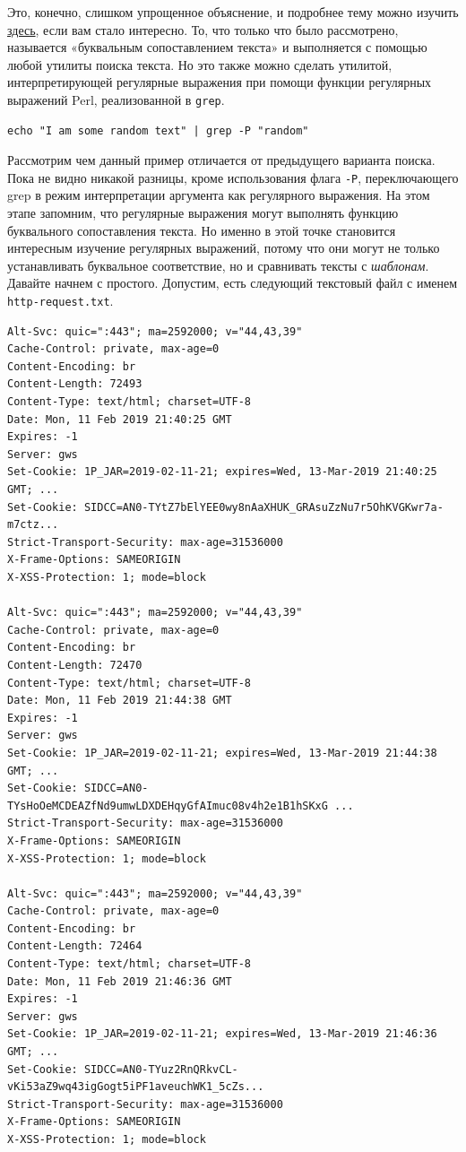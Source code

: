 \documentclass[a4paper,12pt,final,openany]{extbook}
\begin{document}
Это, конечно, слишком упрощенное объяснение, и подробнее тему можно
изучить \href{https://stackoverflow.com/a/1627904/7437737}{здесь}, если
вам стало интересно. То, что только что было рассмотрено, называется
«буквальным сопоставлением текста» и выполняется с помощью
любой утилиты поиска текста. Но это также можно сделать
утилитой, интерпретирующей регулярные выражения при помощи функции
регулярных выражений Perl, реализованной в \texttt{grep}.
\begin{verbatim}
echo "I am some random text" | grep -P "random"
\end{verbatim}

Рассмотрим чем данный пример отличается от предыдущего варианта поиска.
Пока не видно никакой разницы, кроме использования флага \texttt{-P},
переключающего grep в режим интерпретации аргумента как регулярного
выражения. На этом этапе запомним, что регулярные выражения могут
выполнять функцию буквального сопоставления текста. Но именно в этой
точке становится интересным изучение регулярных выражений, потому что
они могут не только устанавливать буквальное соответствие, но и
сравнивать тексты с \emph{шаблонам}. Давайте начнем с простого.
Допустим, есть следующий текстовый файл с именем
\texttt{http-request.txt}.
\begin{verbatim}
Alt-Svc: quic=":443"; ma=2592000; v="44,43,39"
Cache-Control: private, max-age=0
Content-Encoding: br
Content-Length: 72493
Content-Type: text/html; charset=UTF-8
Date: Mon, 11 Feb 2019 21:40:25 GMT
Expires: -1
Server: gws
Set-Cookie: 1P_JAR=2019-02-11-21; expires=Wed, 13-Mar-2019 21:40:25 GMT; ...
Set-Cookie: SIDCC=AN0-TYtZ7bElYEE0wy8nAaXHUK_GRAsuZzNu7r5OhKVGKwr7a-m7ctz...
Strict-Transport-Security: max-age=31536000
X-Frame-Options: SAMEORIGIN
X-XSS-Protection: 1; mode=block

Alt-Svc: quic=":443"; ma=2592000; v="44,43,39"
Cache-Control: private, max-age=0
Content-Encoding: br
Content-Length: 72470
Content-Type: text/html; charset=UTF-8
Date: Mon, 11 Feb 2019 21:44:38 GMT
Expires: -1
Server: gws
Set-Cookie: 1P_JAR=2019-02-11-21; expires=Wed, 13-Mar-2019 21:44:38 GMT; ...
Set-Cookie: SIDCC=AN0-TYsHoOeMCDEAZfNd9umwLDXDEHqyGfAImuc08v4h2e1B1hSKxG ...
Strict-Transport-Security: max-age=31536000
X-Frame-Options: SAMEORIGIN
X-XSS-Protection: 1; mode=block

Alt-Svc: quic=":443"; ma=2592000; v="44,43,39"
Cache-Control: private, max-age=0
Content-Encoding: br
Content-Length: 72464
Content-Type: text/html; charset=UTF-8
Date: Mon, 11 Feb 2019 21:46:36 GMT
Expires: -1
Server: gws
Set-Cookie: 1P_JAR=2019-02-11-21; expires=Wed, 13-Mar-2019 21:46:36 GMT; ...
Set-Cookie: SIDCC=AN0-TYuz2RnQRkvCL-vKi53aZ9wq43igGogt5iPF1aveuchWK1_5cZs...
Strict-Transport-Security: max-age=31536000
X-Frame-Options: SAMEORIGIN
X-XSS-Protection: 1; mode=block
\end{verbatim}
\end{document}
